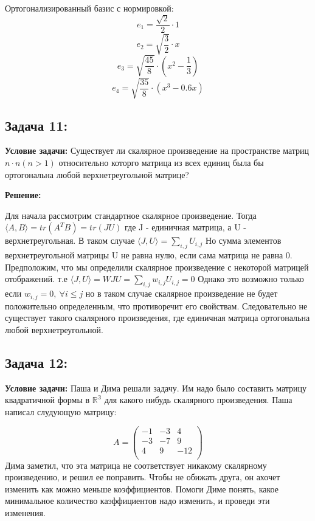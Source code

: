 \documentclass[a4paper,12pt]{article}
\begin{document}
Ортогонализированный базис с нормировкой:
\[
e_1 = \frac{\sqrt{2}}{2} \cdot 1
\]
\[
e_2 = \sqrt{\frac{3}{2}} \cdot x
\]
\[
e_3 = \sqrt{\frac{45}{8}} \cdot \left( x^2 - \frac{1}{3} \right)
\]
\[
e_4 = \sqrt{\frac{35}{8}} \cdot \left( x^3 - 0.6x \right)
\]

\vspace{1cm}
\subsection{Задача 11: } 
\textbf{Условие задачи: }Существует ли скалярное произведение на пространстве матриц $n\cdot n(n > 1)$ относительно которго матрица из всех единиц была бы ортогональна любой верхнетреугольной матрице? 

\textbf{Решение: }

Для начала рассмотрим стандартное скалярное произведение. Тогда $\langle A, B \rangle = tr(A^TB) = tr(JU)$ где J - единичная матрица, а U - верхнетреугольная. В таком случае $\langle J, U \rangle = \sum_{i, j} U_{i, j}$ Но сумма элементов верхнетреугольной матрицы U не равна нулю, если сама матрица не равна 0. Предположим, что мы определили скалярное произведение с некоторой матрицей отображений. т.е $\langle J, U \rangle = WJU = \sum_{i, j}w_{i, j} U_{i, j} = 0$ Однако это возможно только если $w_{i, j} = 0, \ \forall i \le j$ но в таком случае скалярное произведение не будет положительно определенным, что противоречит его свойствам. Следовательно не существует такого скалярного произведения, где единичная матрица ортогональна любой верхнетреугольной. 


\vspace{1cm}
\subsection{Задача 12: }
\textbf{Условие задачи: }
Паша и Дима решали задачу. Им надо было составить матрицу квадратичной формы в $\mathbb{R^3}$ для какого нибудь скалярного произведения. Паша написал слудующую матрицу: 

\[
A = \begin{pmatrix}
-1 & -3 & 4 \\
-3 & -7 & 9 \\
4 & 9 & -12 \\
\end{pmatrix}
\] Дима заметил, что эта матрица не соответствует никакому скалярному произведению, и решил ее поправить. Чтобы не обижать друга, он ахочет изменить как можно меньше коэффициентов. Помоги  Диме понять, какое минимальное количество каэффициентов надо изменить, и проведи эти изменения. 
\end{document}
